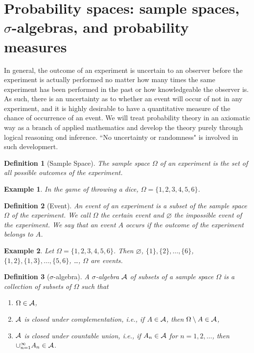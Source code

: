\documentclass[openany,12pt]{book}
\newtheorem{definition}{Definition}[chapter]
\newtheorem{example}{Example}[chapter]
\begin{document}
\section{Probability spaces: sample spaces, \texorpdfstring{$\sigma$}{sigma}-algebras, and probability measures}

In general, the outcome of an experiment is uncertain to an observer before the experiment is actually performed no matter how many times the same experiment has been performed in the past or how knowledgeable the observer is. As such, there is an uncertainty as to whether an event will occur of not in any experiment, and it is highly desirable to have a quantitative measure of the chance of occurrence of an event. We will treat probability theory in an axiomatic way as a branch of applied mathematics and develop the theory purely through logical reasoning ond inference. ``No uncertainty or randomness" is involved in such developmert.

\begin{definition}[Sample Space]
  The sample space $\Omega$ of an experiment is the set of all possible outcomes of the experiment.
\end{definition}

\begin{example}
  In the game of throwing a dice, $\Omega=\{1,2,3,4,5,6\}$.
\end{example}

\begin{definition}[Event]
  An event of an experiment is a subset of the sample space $\Omega$ of the experiment. We call $\Omega$ the certain event and $\varnothing$ the impossible event of the experiment. We say that an event $A$ occurs if the outcome of the experiment belongs to $A$.
\end{definition}

\begin{example}
  Let $\Omega=\{1,2,3,4,5,6\}$. Then $\varnothing$, $\{1\},\{2\},\dots,\{6\}$, $\{1,2\},\{1,3\},\dots,\{5,6\}$, \dots, $\Omega$ are events.
\end{example}

\begin{definition}[$\sigma$-algebra]
  A $\sigma$-algebra $\mathcal{A}$ of subsets of a sample space $\Omega$ is a collection of subsets of $\Omega$ such that
  \begin{enumerate}
    \item $\Omega\in\mathcal{A}$,
    \item $\mathcal{A}$ is closed under complementation, i.e., if $A\in\mathcal{A}$, then $\Omega\setminus A\in\mathcal{A}$,
    \item $\mathcal{A}$ is closed under countable union, i.e., if $A_n\in\mathcal{A}$ for $n=1,2,\dots$, then $\cup_{n=1}^\infty A_n \in\mathcal{A}$.
  \end{enumerate}
\end{definition}
\end{document}
